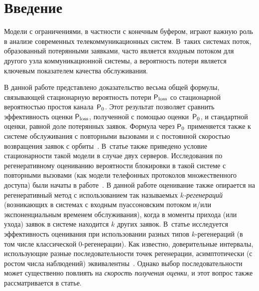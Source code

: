 
\vspace*{-7pt}


      \thispagestyle{headings}

      \begin{multicols}{2}

            \label{st\stat}


\section{Введение} 


Модели с ограничениями, в частности с конечным буфером, играют
важную роль в анализе современных     телекоммуникационных систем. 
В~таких системах поток, образованный потерянными заявками, часто
является входным потоком для другого узла коммуникационной системы,
а вероятность потери является ключевым показателем качества
обслуживания.


В данной работе  представлено  доказательство весьма общей формулы, связывающей
стационарную вероятность потери ${\sf P}_{\mathrm{loss}}$ со ста\-цио\-нарной\linebreak
вероятностью
простоя канала~${\sf P}_0$.  Этот результат\linebreak
 позволяет сравнить эффективность оценки
${\sf P}_{\mathrm{loss}}$, полученной с помощью оценки~${\sf P}_0$, и  стандартной оценки, равной
доле потерянных заявок.  Формула через ${\sf P}_0$ применяется также
 к системе обслуживания с повторными вызовами и
с  постоянной скоростью возвращения заявок с орбиты~\cite{Avr}.   \mbox{В~статье}
также приведено условие стационарности такой модели в случае
двух серверов. Исследования по регенеративному оцениванию
вероятности блокировки в такой сис\-те\-ме  с повторными вызовами  (как  модели телефонных
протоколов  множественного доступа) были начаты   в работе~\cite{Minsk}.
 В  данной работе оценивание  также  опирается на регенеративный  метод с
использованием так называемых {\it  $k$-ре\-ге\-не\-ра\-ций} (возникающих в сис\-те\-мах с
входным пуассоновским потоком и/или экспоненциальным временем обслуживания),
когда в моменты прихода (или ухода) заявок в сис\-те\-ме находится $k$ других
заявок. В~статье исследуется эффективность оценивания при использовании
разных типов $k$-ре\-ге\-не\-ра\-ций (в том числе классической $0$-ре\-ге\-не\-ра\-ции). Как
известно,  доверительные интервалы, использующие разные последовательности
точек регенерации, асимптотически (с ростом числа наблюдений) эквивалентны~\cite{Shedler}.  
Однако выбор по\-сле\-до\-ва\-тель\-ности может существенно повлиять на
{\it скорость получения оценки}, и этот вопрос также рассматривается в статье.


\end{multicols}
